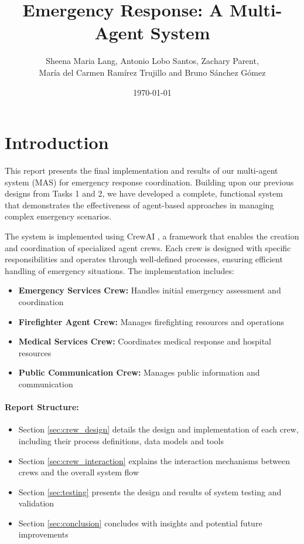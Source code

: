\documentclass[a4paper]{article}
\title{Emergency Response: A Multi-Agent System}
\author{Sheena Maria Lang, Antonio Lobo Santos, Zachary Parent, \\ María del Carmen Ramírez Trujillo and Bruno Sánchez Gómez}
\date{\today}
\begin{document}
\maketitle
\tableofcontents
\newpage

\section{Introduction}
This report presents the final implementation and results of our multi-agent system (MAS) for emergency response coordination. Building upon our previous designs from Tasks 1 and 2, we have developed a complete, functional system that demonstrates the effectiveness of agent-based approaches in managing complex emergency scenarios.

The system is implemented using CrewAI \cite{crewai}, a framework that enables the creation and coordination of specialized agent crews. Each crew is designed with specific responsibilities and operates through well-defined processes, ensuring efficient handling of emergency situations. The implementation includes:

\begin{itemize}
    \item \textbf{Emergency Services Crew:} Handles initial emergency assessment and coordination
    \item \textbf{Firefighter Agent Crew:} Manages firefighting resources and operations
    \item \textbf{Medical Services Crew:} Coordinates medical response and hospital resources
    \item \textbf{Public Communication Crew:} Manages public information and communication
\end{itemize}

\paragraph{Report Structure:}
\begin{itemize}
    \item Section \ref{sec:crew_design} details the design and implementation of each crew, including their process definitions, data models and tools
    \item Section \ref{sec:crew_interaction} explains the interaction mechanisms between crews and the overall system flow
    \item Section \ref{sec:testing} presents the design and results of system testing and validation
    \item Section \ref{sec:conclusion} concludes with insights and potential future improvements
\end{itemize}
\end{document}

